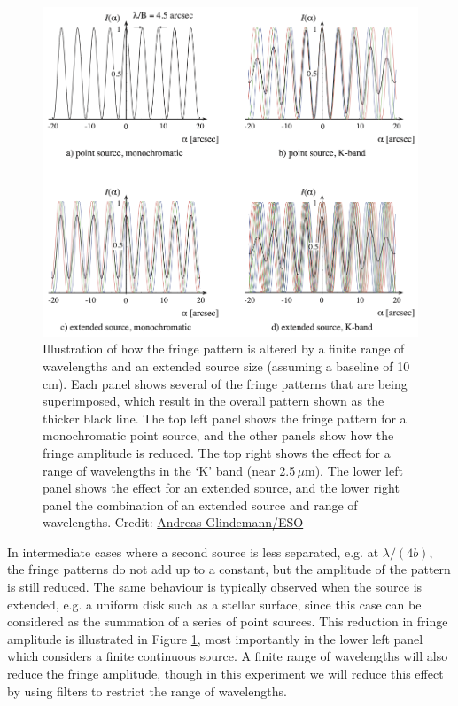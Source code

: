 \documentclass[11pt]{article}
\begin{document}
\begin{figure}[h!]
    \centering
    \includegraphics[width=1\textwidth]{doc/coherence.png}
    \caption{Illustration of how the fringe pattern is altered by a finite range of wavelengths and an extended source size (assuming a baseline of 10\,cm). Each panel shows several of the fringe patterns that are being superimposed, which result in the overall pattern shown as the thicker black line. The top left panel shows the fringe pattern for a monochromatic point source, and the other panels show how the fringe amplitude is reduced. The top right shows the effect for a range of wavelengths in the `K' band (near 2.5\,$\mu$m). The lower left panel shows the effect for an extended source, and the lower right panel the combination of an extended source and range of wavelengths. Credit: \href{https://www.eso.org/sci/facilities/paranal/telescopes/vlti/tuto/tutorial_spatial_interferometry.pdf}{Andreas Glindemann/ESO}}
    \label{fig:coherence}
\end{figure}

In intermediate cases where a second source is less separated, e.g. at $\lambda/(4b)$, the fringe patterns do not add up to a constant, but the amplitude of the pattern is still reduced. The same behaviour is typically observed when the source is extended, e.g. a uniform disk such as a stellar surface, since this case can be considered as the summation of a series of point sources. This reduction in fringe amplitude is illustrated in Figure \ref{fig:coherence}, most importantly in the lower left panel which considers a finite continuous source. A finite range of wavelengths will also reduce the fringe amplitude, though in this experiment we will reduce this effect by using filters to restrict the range of wavelengths.
\end{document}
